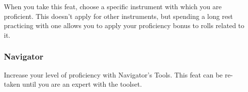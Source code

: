     When you take this feat, choose a specific instrument with which you are proficient.
    This doesn't apply for other instruments, but spending a long rest practicing with one allows you to apply your proficiency bonus to rolls related to it.

\subsubsection{Navigator} \label{feat::navigator}
    Increase your level of proficiency with Navigator's Tools.
    This feat can be re-taken until you are an expert with the toolset.
